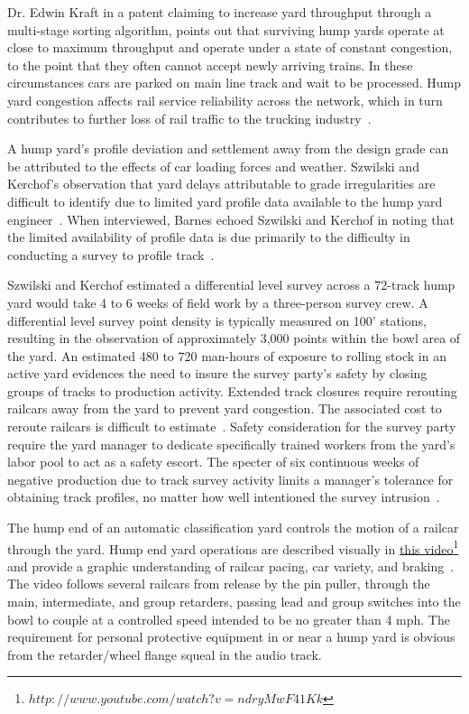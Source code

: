 Dr. Edwin Kraft in a patent claiming to increase yard throughput through a multi-stage sorting algorithm, points out that surviving hump yards operate at close to maximum throughput and operate under a state of constant congestion, to the point that they often cannot accept newly arriving trains. In these circumstances cars are parked on main line track and wait to be processed. Hump yard congestion affects rail service reliability across the network, which in turn contributes to further loss of rail traffic to the trucking industry~\citep{KraftPaten00}.

A hump yard's profile deviation and settlement away from the design grade can be attributed to the effects of car loading forces and weather. Szwilski and Kerchof's observation that yard delays attributable to grade irregularities are difficult to identify due to limited yard profile data available to the hump yard engineer~\citep{2005szwilski}. When interviewed, Barnes echoed Szwilski and Kerchof in noting that the limited availability of profile data is due primarily to the difficulty in conducting a survey to profile track~\citep{2007barnes}.

Szwilski and Kerchof estimated a differential level survey across a 72-track hump yard would take 4 to 6 weeks of field work by a three-person survey crew. A differential level survey point density is typically measured on 100' stations, resulting in the observation of approximately 3,000 points within the bowl area of the yard. An estimated 480 to 720 man-hours of exposure to rolling stock in an active yard evidences the need to insure the survey party's safety by closing groups of tracks to production activity. Extended track closures require rerouting railcars away from the yard to prevent yard congestion. The associated cost to reroute railcars is difficult to estimate~\citep{2005szwilski}. Safety consideration for the survey party require the yard manager to dedicate specifically trained workers from the yard's labor pool to act as a safety escort. The specter of six continuous weeks of negative production due to track survey activity limits a manager's tolerance for obtaining track profiles, no matter how well intentioned the survey intrusion~\citep{2007barnes}.

The hump end of an automatic classification yard controls the motion of a railcar through the yard. Hump end yard operations are described visually in \href{http://www.youtube.com/watch?v=ndryMwF41Kk}{this video}\footnote{$http://www.youtube.com/watch?v=ndryMwF41Kk$} and provide a graphic understanding of railcar pacing, car variety, and braking~\citep{HumpOpsVid}. The video follows several railcars from release by the pin puller, through the main, intermediate, and group retarders, passing lead and group switches into the bowl to couple at a controlled speed intended to be no greater than 4 mph. The requirement for personal protective equipment in or near a hump yard is obvious from the retarder/wheel flange squeal in the audio track.

